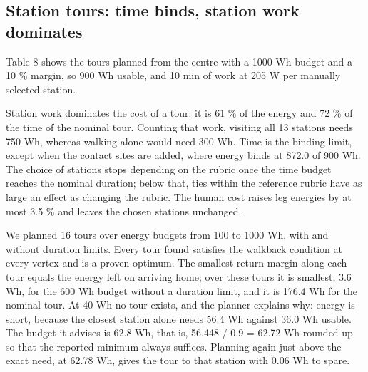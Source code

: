 \documentclass[11pt,a4paper]{article}
\begin{document}
\subsection{Station tours: time binds, station work dominates}

Table 8 shows the tours planned from the centre with a 1000 Wh budget and a 10 \% margin, so 900 Wh usable, and 10 min of work at 205 W per manually selected station.

\begin{table}[H]
\centering\small
\caption{\textbf{Table 8. Station tours from the centre of the area.}}
\end{table}

Station work dominates the cost of a tour: it is 61 \% of the energy and 72 \% of the time of the nominal tour. Counting that work, visiting all 13 stations needs 750 Wh, whereas walking alone would need 300 Wh. Time is the binding limit, except when the contact sites are added, where energy binds at 872.0 of 900 Wh. The choice of stations stops depending on the rubric once the time budget reaches the nominal duration; below that, ties within the reference rubric have as large an effect as changing the rubric. The human cost raises leg energies by at most 3.5 \% and leaves the chosen stations unchanged.

We planned 16 tours over energy budgets from 100 to 1000 Wh, with and without duration limits. Every tour found satisfies the walkback condition at every vertex and is a proven optimum. The smallest return margin along each tour equals the energy left on arriving home; over these tours it is smallest, 3.6 Wh, for the 600 Wh budget without a duration limit, and it is 176.4 Wh for the nominal tour. At 40 Wh no tour exists, and the planner explains why: energy is short, because the closest station alone needs 56.4 Wh against 36.0 Wh usable. The budget it advises is 62.8 Wh, that is, 56.448 / 0.9 = 62.72 Wh rounded up so that the reported minimum always suffices. Planning again just above the exact need, at 62.78 Wh, gives the tour to that station with 0.06 Wh to spare.
\end{document}
